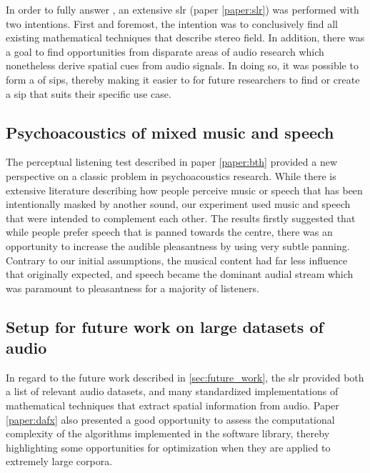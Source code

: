 In order to fully answer \rqb{}, an extensive \gls{slr} (paper \ref{paper:slr}) was performed with two intentions. First and foremost, the intention was to conclusively find all existing mathematical techniques that describe stereo field. In addition, there was a goal to find  opportunities from disparate areas of audio research which nonetheless derive spatial cues from audio signals. In doing so, it was possible to form a  of \glspl{sip}, thereby making it easier to for future researchers to find or create a \gls{sip} that suits their specific use case.

\subsection{Psychoacoustics of mixed music and speech}
The perceptual listening test described in paper \ref{paper:bth} provided a new perspective on a classic problem in psychoacoustics research. While there is extensive literature describing how people perceive music or speech that has been intentionally masked by another sound, our experiment used music and speech that were intended to complement each other. The results firstly suggested that while people prefer speech that is panned towards the centre, there was an opportunity to increase the audible pleasantness by using very subtle panning. Contrary to our initial assumptions, the musical content had far less influence that originally expected, and speech became the dominant audial stream which was paramount to pleasantness for a majority of listeners.

\subsection{Setup for future work on large datasets of audio}
In regard to the future work described in \cref{sec:future_work}, the \gls{slr} provided both a list of relevant audio datasets, and many standardized implementations of mathematical techniques that extract spatial information from audio.
Paper \ref{paper:dafx} also presented a good opportunity to assess the computational complexity of the algorithms implemented in the software library, thereby highlighting some opportunities for optimization when they are applied to extremely large corpora.